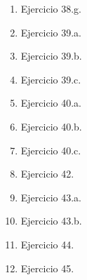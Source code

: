 \begin{enumerate}
    \item Ejercicio 38.g.
    \item Ejercicio 39.a.
    \item Ejercicio 39.b.
    \item Ejercicio 39.c.
    \item Ejercicio 40.a.
    \item Ejercicio 40.b.
    \item Ejercicio 40.c.
    \item Ejercicio 42.
    \item Ejercicio 43.a.
    \item Ejercicio 43.b.
    \item Ejercicio 44.
    \item Ejercicio 45.
    
\end{enumerate}

